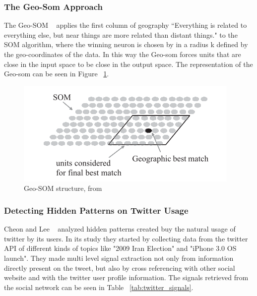 \subsubsection{The Geo-Som Approach} 
\label{ssub:types_of_soms}
The Geo-SOM ~\citet{Bacao2005} applies the first column of geography “Everything is related to everything else, but near things are more related than distant things." to the SOM algorithm, where the winning neuron is chosen by in a radius k defined by the geo-coordinates of the data. In this way the Geo-som forces units that are close in the input space to be close in the output space. The representation of the Geo-som can be seen in Figure ~\ref{fig:geo_som}.

\begin{figure}[tb]
  \begin{center}
    \includegraphics[]{images/6_geo-som.png}
  \end{center}
  \caption{Geo-SOM structure, from ~\citet{Bacao2005}}
  \label{fig:geo_som}
\end{figure}

\subsubsection{Detecting Hidden Patterns on Twitter Usage} 
\label{ssub:detecting_hidden_patterns_on_twitter_usage}
Cheon and Lee ~\citep{Cheong2010} analyzed hidden patterns created buy the natural usage of twitter by its users. In its study they started by collecting data from the twitter API of different kinds of topics like "2009 Iran Election" and "iPhone 3.0 OS launch". They made multi level signal extraction not only from information directly present on the tweet, but also by cross referencing with other social website and with the twitter user profile information. The signals retrieved from the social network can be seen in Table ~\ref{tab:twitter_signals}.

